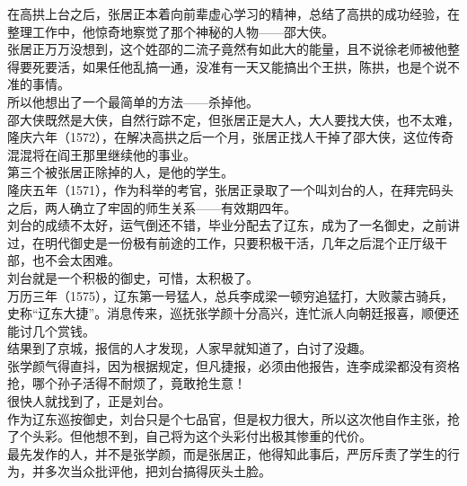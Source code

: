 \begin{multicols}{\theparacolNo}
在高拱上台之后，张居正本着向前辈虚心学习的精神，总结了高拱的成功经验，在整理工作中，他惊奇地察觉了那个神秘的人物——邵大侠。\\

张居正万万没想到，这个姓邵的二流子竟然有如此大的能量，且不说徐老师被他整得要死要活，如果任他乱搞一通，没准有一天又能搞出个王拱，陈拱，也是个说不准的事情。\\

所以他想出了一个最简单的方法——杀掉他。\\

邵大侠既然是大侠，自然行踪不定，但张居正是大人，大人要找大侠，也不太难，隆庆六年（1572），在解决高拱之后一个月，张居正找人干掉了邵大侠，这位传奇混混将在阎王那里继续他的事业。\\

第三个被张居正除掉的人，是他的学生。\\

隆庆五年（1571），作为科举的考官，张居正录取了一个叫刘台的人，在拜完码头之后，两人确立了牢固的师生关系——有效期四年。\\

刘台的成绩不太好，运气倒还不错，毕业分配去了辽东，成为了一名御史，之前讲过，在明代御史是一份极有前途的工作，只要积极干活，几年之后混个正厅级干部，也不会太困难。\\

刘台就是一个积极的御史，可惜，太积极了。\\

万历三年（1575），辽东第一号猛人，总兵李成梁一顿穷追猛打，大败蒙古骑兵，史称“辽东大捷”。消息传来，巡抚张学颜十分高兴，连忙派人向朝廷报喜，顺便还能讨几个赏钱。\\

结果到了京城，报信的人才发现，人家早就知道了，白讨了没趣。\\

张学颜气得直抖，因为根据规定，但凡捷报，必须由他报告，连李成梁都没有资格抢，哪个孙子活得不耐烦了，竟敢抢生意！\\

很快人就找到了，正是刘台。\\

作为辽东巡按御史，刘台只是个七品官，但是权力很大，所以这次他自作主张，抢了个头彩。但他想不到，自己将为这个头彩付出极其惨重的代价。\\

最先发作的人，并不是张学颜，而是张居正，他得知此事后，严厉斥责了学生的行为，并多次当众批评他，把刘台搞得灰头土脸。\\


\end{multicols}
